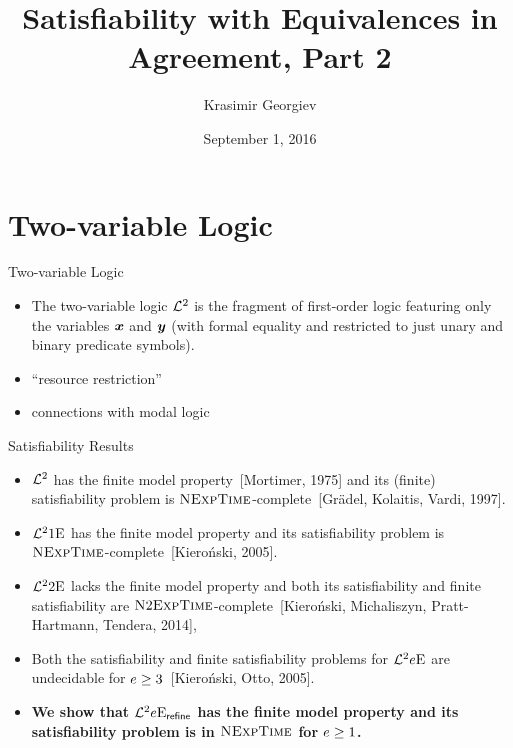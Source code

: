 \documentclass{beamer}
\begin{document}
\title{Satisfiability with Equivalences in Agreement, Part 2}
\author{Krasimir Georgiev}
\date{September 1, 2016}
\frame{\titlepage}

\section{Two-variable Logic}
\begin{frame}{Two-variable Logic}
\begin{itemize}
  \item 
  The two-variable logic $\mathcal{L}^{2}$ is the fragment of first-order logic featuring
  only the variables $\bm{x}$ and $\bm{y}$ (with formal equality and restricted to
  just unary and binary predicate symbols).
  
  \item ``resource restriction''
  \item connections with modal logic
\end{itemize}
\end{frame}

\begin{frame}{Satisfiability Results}
\begin{itemize}
  \item
  $\mathcal{L}^{2}$ has the finite model property~{[Mortimer, 1975]} and
  its (finite) satisfiability problem is $\text{\normalfont{\scshape NExpTime}}$-complete~{[Gr{\"a}del,
  Kolaitis, Vardi, 1997]}.
  
  \pause
  \item $\mathcal{L}^{2}{1}\mathrm{E}_{{}}$ has the finite model property and its satisfiability
  problem is $\text{\normalfont{\scshape NExpTime}}$-complete~{[Kiero{\'n}ski, 2005]}.
  
  \pause
  \item $\mathcal{L}^{2}{2}\mathrm{E}_{{}}$ lacks the finite model property and both its
  satisfiability and finite satisfiability are
  $\text{\normalfont{\scshape N}}2\text{\normalfont{\scshape ExpTime}}$-complete~{[Kieroński, Michaliszyn, Pratt-Hartmann, Tendera, 2014]},
  
  \pause
  \item Both the satisfiability and finite satisfiability
  problems for $\mathcal{L}^{2}{e}\mathrm{E}_{{}}$ are undecidable for
  $e\geq3$~{[Kieroński, Otto, 2005]}.
  
  \pause
  \item
  \textbf{We show that $\mathcal{L}^{2}{e}\mathrm{E}_{\mathsf{refine}}$ has the finite model
  property and its satisfiability problem is in $\text{\normalfont{\scshape NExpTime}}$ for $e\geq1$.}
\end{itemize}
\end{frame}
\end{document}
